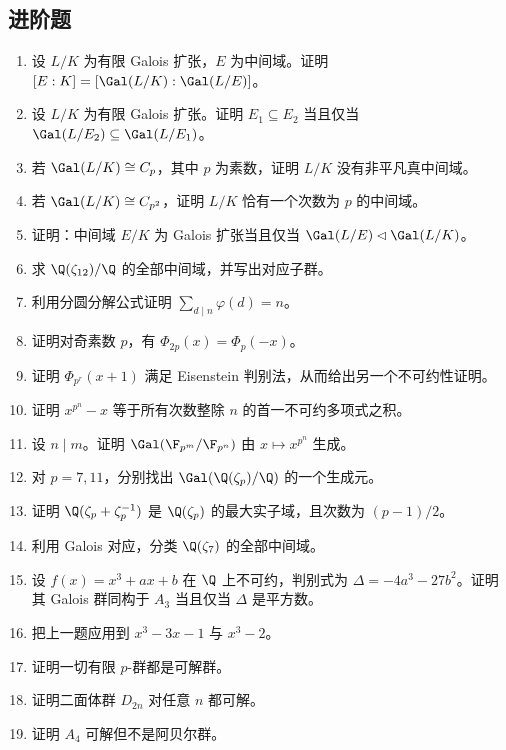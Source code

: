 \subsection*{进阶题}

\begin{enumerate}[resume, label=\textbf{习题12.\arabic*.}, leftmargin=*, itemsep=0.75em]
\item \medium 设 $L/K$ 为有限 Galois 扩张，$E$ 为中间域。证明 $[E:K]=[\Gal(L/K):\Gal(L/E)]$。
\item \medium 设 $L/K$ 为有限 Galois 扩张。证明 $E_1\subseteq E_2$ 当且仅当 $\Gal(L/E_2)\subseteq\Gal(L/E_1)$。
\item \medium 若 $\Gal(L/K)\cong C_p$，其中 $p$ 为素数，证明 $L/K$ 没有非平凡真中间域。
\item \medium 若 $\Gal(L/K)\cong C_{p^2}$，证明 $L/K$ 恰有一个次数为 $p$ 的中间域。
\item \medium 证明：中间域 $E/K$ 为 Galois 扩张当且仅当 $\Gal(L/E)\lhd\Gal(L/K)$。
\item \medium 求 $\Q(\zeta_{12})/\Q$ 的全部中间域，并写出对应子群。
\item \medium 利用分圆分解公式证明 $\sum_{d\mid n}\varphi(d)=n$。
\item \medium 证明对奇素数 $p$，有 $\Phi_{2p}(x)=\Phi_p(-x)$。
\item \medium 证明 $\Phi_{p^r}(x+1)$ 满足 Eisenstein 判别法，从而给出另一个不可约性证明。
\item \medium 证明 $x^{p^n}-x$ 等于所有次数整除 $n$ 的首一不可约多项式之积。
\item \medium 设 $n\mid m$。证明 $\Gal(\F_{p^m}/\F_{p^n})$ 由 $x\mapsto x^{p^n}$ 生成。
\item \medium 对 $p=7,11$，分别找出 $\Gal(\Q(\zeta_p)/\Q)$ 的一个生成元。
\item \medium 证明 $\Q(\zeta_p+\zeta_p^{-1})$ 是 $\Q(\zeta_p)$ 的最大实子域，且次数为 $(p-1)/2$。
\item \medium 利用 Galois 对应，分类 $\Q(\zeta_7)$ 的全部中间域。
\item \medium 设 $f(x)=x^3+ax+b$ 在 $\Q$ 上不可约，判别式为 $\Delta=-4a^3-27b^2$。证明其 Galois 群同构于 $A_3$ 当且仅当 $\Delta$ 是平方数。
\item \medium 把上一题应用到 $x^3-3x-1$ 与 $x^3-2$。
\item \medium 证明一切有限 $p$-群都是可解群。
\item \medium 证明二面体群 $D_{2n}$ 对任意 $n$ 都可解。
\item \medium 证明 $A_4$ 可解但不是阿贝尔群。

\end{enumerate}
